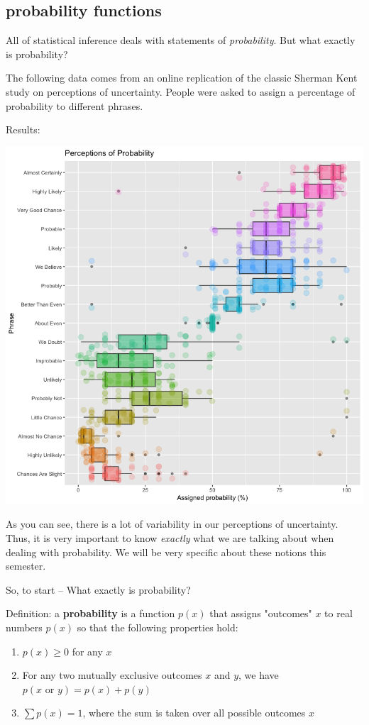 \documentclass[11pt]{article}
\begin{document}
\subsection*{probability functions}
\label{sec-2-1}

All of statistical inference deals with statements of \emph{probability}.  But what exactly is probability?

The following data comes from an online replication of the classic Sherman Kent study on perceptions of uncertainty.  People were asked to assign a percentage of probability to different phrases.

Results:

\includegraphics[width=.9\linewidth]{figures/probPlot.png}

As you can see, there is a lot of variability in our perceptions of uncertainty.  Thus, it is very important to know \emph{exactly} what we are talking about when dealing with probability.  We will be very specific about these notions this semester.

So, to start -- What exactly is probability?

Definition: a \textbf{probability} is a function $p(x)$ that assigns "outcomes" $x$ to real numbers $p(x)$ so that the following properties hold:

\begin{enumerate}
\item $p(x)\geq 0$ for any $x$
\item For any two mutually exclusive outcomes $x$ and $y$, we have $p(x\text{ or }y)=p(x)+p(y)$
\item $\sum p(x) = 1$, where the sum is taken over all possible outcomes $x$
\end{enumerate}
\end{document}
